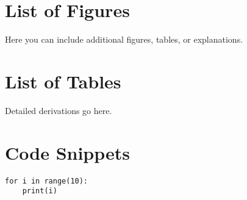 \newpage
\section{List of Figures}
Here you can include additional figures, tables, or explanations.

\newpage
\section{List of Tables}
Detailed derivations go here.

\newpage
\section{Code Snippets}

\begin{verbatim}
for i in range(10):
    print(i)
\end{verbatim}